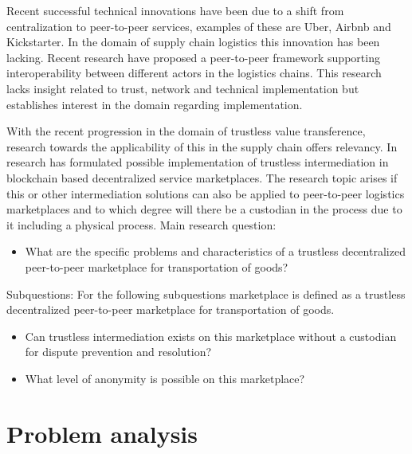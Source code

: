 \documentclass[11pt]{article}
\begin{document}
Recent successful technical innovations have been due to a shift from centralization to peer-to-peer services, examples of these are Uber, Airbnb and Kickstarter. In the domain of supply chain logistics this innovation has been lacking. Recent research \cite{peer-to-peerDecentralizedLogistics} have proposed a peer-to-peer framework supporting interoperability between different actors in the logistics chains. This research lacks insight related to trust, network and technical implementation but establishes interest in the domain regarding implementation. \par
With the recent progression in the domain of trustless value transference, research towards the applicability of this in the supply chain offers relevancy. In \cite{trustlessIntermediationInBCServiceMarket} research has formulated possible implementation of trustless intermediation in blockchain based decentralized service marketplaces. The research topic arises if this or other intermediation solutions can also be applied to peer-to-peer logistics marketplaces and to which degree will there be a custodian in the process due to it including a physical process. 
\bigbreak
\noindent Main research question: 
\begin{itemize}
  \item What are the specific problems and characteristics of a trustless decentralized peer-to-peer marketplace for transportation of goods?
\end{itemize}
\bigbreak
\noindent Subquestions: 
\bigbreak 
\noindent For the following subquestions marketplace is defined as a trustless decentralized peer-to-peer marketplace for transportation of goods.
\begin{itemize}
  \item Can trustless intermediation exists on this marketplace without a custodian for dispute prevention and resolution?
  \item What level of anonymity is possible on this marketplace? 
\end{itemize}

\section{Problem analysis}
\end{document}
